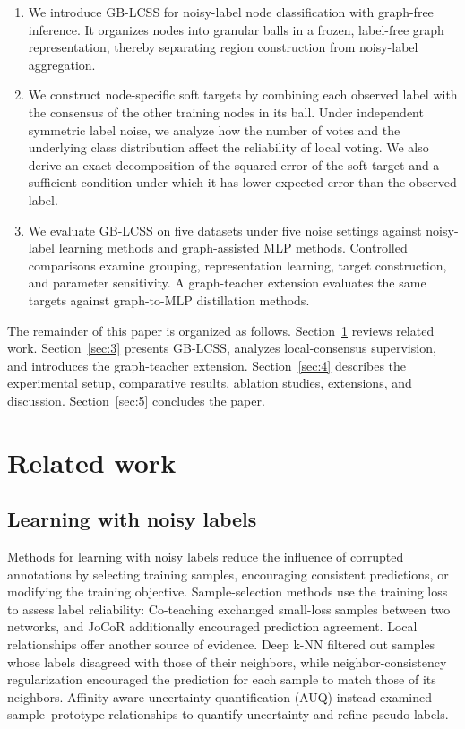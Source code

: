 \documentclass[times,review,10pt]{elsarticle}
\theoremstyle{definition}
\theoremstyle{plain}
\begin{document}
\begin{enumerate}[label=(\arabic*)]
\item We introduce GB-LCSS for noisy-label node classification with graph-free inference. It organizes nodes into granular balls in a frozen, label-free graph representation, thereby separating region construction from noisy-label aggregation.
\item We construct node-specific soft targets by combining each observed label with the consensus of the other training nodes in its ball. Under independent symmetric label noise, we analyze how the number of votes and the underlying class distribution affect the reliability of local voting. We also derive an exact decomposition of the squared error of the soft target and a sufficient condition under which it has lower expected error than the observed label.
\item We evaluate GB-LCSS on five datasets under five noise settings against noisy-label learning methods and graph-assisted MLP methods. Controlled comparisons examine grouping, representation learning, target construction, and parameter sensitivity. A graph-teacher extension evaluates the same targets against graph-to-MLP distillation methods.
\end{enumerate}

The remainder of this paper is organized as follows. Section~\ref{sec:2} reviews related work. Section~\ref{sec:3} presents GB-LCSS, analyzes local-consensus supervision, and introduces the graph-teacher extension. Section~\ref{sec:4} describes the experimental setup, comparative results, ablation studies, extensions, and discussion. Section~\ref{sec:5} concludes the paper.

\section{Related work}\label{sec:2}

\subsection{Learning with noisy labels}\label{sec:2.1}

Methods for learning with noisy labels reduce the influence of corrupted annotations by selecting training samples, encouraging consistent predictions, or modifying the training objective. Sample-selection methods use the training loss to assess label reliability: Co-teaching \cite{ref17} exchanged small-loss samples between two networks, and JoCoR \cite{ref18} additionally encouraged prediction agreement. Local relationships offer another source of evidence. Deep k-NN \cite{ref11} filtered out samples whose labels disagreed with those of their neighbors, while neighbor-consistency regularization \cite{ref10} encouraged the prediction for each sample to match those of its neighbors. Affinity-aware uncertainty quantification (AUQ) \cite{pr2026auq} instead examined sample--prototype relationships to quantify uncertainty and refine pseudo-labels.
\end{document}
